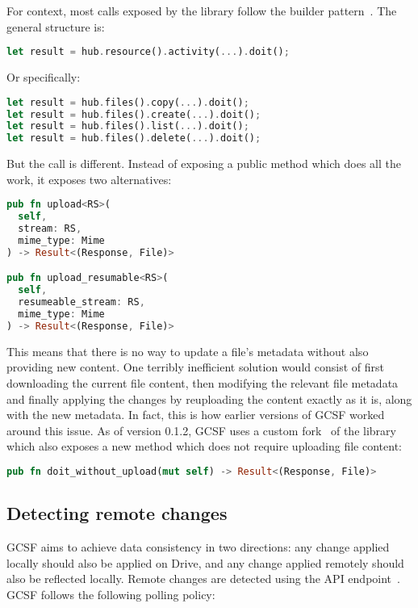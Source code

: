 For context, most calls exposed by the library follow the builder pattern~\cite{gof}. The general structure is:

\begin{lstlisting}[language=Rust, frame=single]
let result = hub.resource().activity(...).doit();
\end{lstlisting}

Or specifically:

\begin{lstlisting}[language=Rust, frame=single]
let result = hub.files().copy(...).doit();
let result = hub.files().create(...).doit();
let result = hub.files().list(...).doit();
let result = hub.files().delete(...).doit();
\end{lstlisting}

But the  call is different. Instead of exposing a public  method which does all the work, it exposes two alternatives:

\begin{lstlisting}[language=Rust, frame=single]
pub fn upload<RS>(
  self,
  stream: RS,
  mime_type: Mime
) -> Result<(Response, File)>

pub fn upload_resumable<RS>(
  self,
  resumeable_stream: RS,
  mime_type: Mime
) -> Result<(Response, File)>
\end{lstlisting}

This means that there is no way to update a file's metadata without also providing new content. One terribly inefficient solution would consist of first downloading the current file content, then modifying the relevant file metadata and finally applying the changes by reuploading the content exactly as it is, along with the new metadata. In fact, this is how earlier versions of GCSF worked around this issue. As of version 0.1.2, GCSF uses a custom fork~\cite{google_drive3_fork} of the library which also exposes a new method which does not require uploading file content:

\begin{lstlisting}[language=Rust, frame=single]
pub fn doit_without_upload(mut self) -> Result<(Response, File)>
\end{lstlisting}

\subsection{Detecting remote changes}

GCSF aims to achieve data consistency in two directions: any change applied locally should also be applied on Drive, and any change applied remotely should also be reflected locally. Remote changes are detected using the  API endpoint~\cite{changes_list_endpoint}. GCSF follows the following polling policy:

